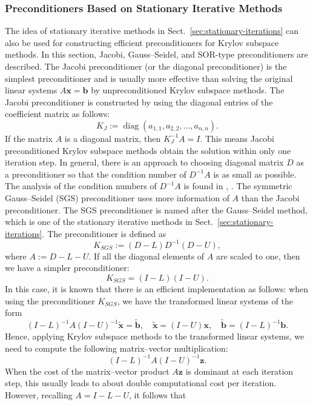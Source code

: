 \subsubsection{{Preconditioners Based on Stationary Iterative Methods}}\label{subsec:stationary-preconditioners}
{The idea of stationary iterative methods in Sect.\ \ref{sec:stationary-iterations} can also be used for constructing efficient preconditioners for Krylov subspace methods. In this section, Jacobi, Gauss--Seidel, and SOR-type preconditioners are described.}
{The Jacobi preconditioner (or the diagonal preconditioner) is the simplest preconditioner and is usually more effective than solving the original linear systems $A\bm x=\bm b$ by unpreconditioned Krylov subspace methods. The Jacobi preconditioner is constructed by using the diagonal entries of the coefficient matrix as follows:}
\[K_J:=\operatorname{diag}(a_{1,1},a_{2,2},\ldots,a_{n,n}).\]
{If the matrix $A$ is a diagonal matrix, then $K_J^{-1}A=I$. This means Jacobi preconditioned Krylov subspace methods obtain the solution within only one iteration step. In general, there is an approach to choosing diagonal matrix $D$ as a preconditioner so that the condition number of $D^{-1}A$ is as small as possible. The analysis of the condition numbers of $D^{-1}A$ is found in , .}
{The symmetric Gauss--Seidel (SGS) preconditioner uses more information of $A$ than the Jacobi preconditioner. The SGS preconditioner is named after the Gauss--Seidel method, which is one of the stationary iterative methods in Sect.\ \ref{sec:stationary-iterations}. The preconditioner is defined as}
\[K_{SGS}:=(D-L)D^{-1}(D-U),\]
{where $A:=D-L-U$. If all the diagonal elements of $A$ are scaled to one, then we have a simpler preconditioner:}
\[K_{SGS}=(I-L)(I-U).\]
{In this case, it is known that there is an efficient implementation as follows: when using the preconditioner $K_{SGS}$, we have the transformed linear systems of the form}
\[(I-L)^{-1}A(I-U)^{-1}\widetilde{\bm x}=\widetilde{\bm b},\quad\widetilde{\bm x}=(I-U)\bm x,\quad\widetilde{\bm b}=(I-L)^{-1}\bm b.\]
{Hence, applying Krylov subspace methods to the transformed linear systems, we need to compute the following matrix--vector multiplication:}
\[(I-L)^{-1}A(I-U)^{-1}\bm z.\]
{When the cost of the matrix--vector product $A\bm z$ is dominant at each iteration step, this usually leads to about double computational cost per iteration. However, recalling $A=I-L-U$, it follows that}
